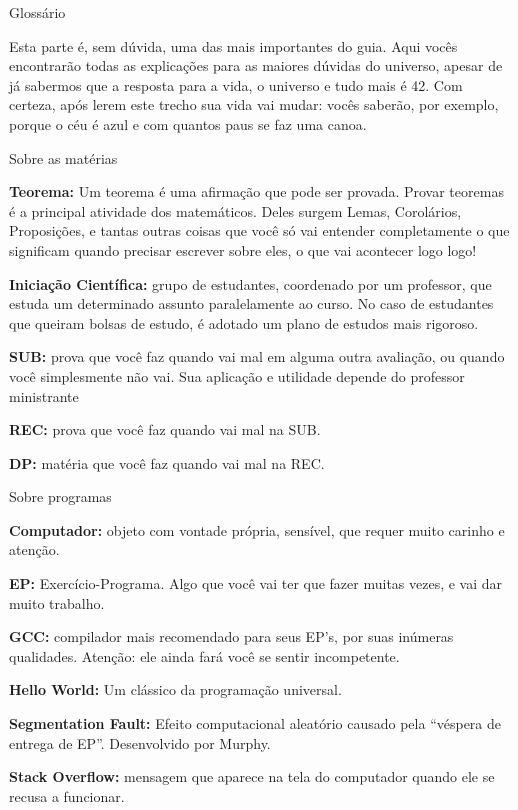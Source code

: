 \begin{secao}{Glossário}

Esta parte é, sem dúvida, uma das mais importantes do guia. Aqui vocês
encontrarão todas as explicações para as maiores dúvidas do universo, apesar de
já sabermos que a resposta para a vida, o universo e tudo mais é 42. Com
certeza, após lerem este trecho sua vida vai mudar: vocês saberão, por exemplo,
porque o céu é azul e com quantos paus se faz uma canoa.

\begin{subsecao}{Sobre as matérias}

{\bf Teorema:} Um teorema é uma afirmação que pode ser provada. Provar
teoremas é a principal atividade dos matemáticos. Deles surgem Lemas,
Corolários, Proposições, e tantas outras coisas que você só vai entender
completamente o que significam quando precisar escrever sobre eles, o que vai
acontecer logo logo!

{\bf Iniciação Científica:} grupo de estudantes, coordenado por um professor, que
estuda um determinado assunto paralelamente ao curso. No caso de estudantes que
queiram bolsas de estudo, é adotado um plano de estudos mais rigoroso.

{\bf SUB:} prova que você faz quando vai mal em alguma outra avaliação, ou
quando você simplesmente não vai. Sua aplicação e utilidade depende do
professor ministrante

{\bf REC:} prova que você faz quando vai mal na SUB.

{\bf DP:} matéria que você faz quando vai mal na REC.
\end{subsecao}

\begin{subsecao}{Sobre programas}

{\bf Computador:} objeto com vontade própria, sensível, que requer muito
carinho e atenção.

{\bf EP:} Exercício-Programa. Algo que você vai ter que fazer muitas vezes, e
vai dar muito trabalho.

{\bf GCC:} compilador mais recomendado para seus EP's, por suas inúmeras
qualidades. Atenção: ele ainda fará você se sentir incompetente.

{\bf Hello World:} Um clássico da programação universal.

{\bf Segmentation Fault:} Efeito computacional aleatório causado pela ``véspera
de entrega de EP''. Desenvolvido por Murphy.

{\bf Stack Overflow:} mensagem que aparece na tela do computador
quando ele se recusa a funcionar.


\end{subsecao}
\end{secao}
